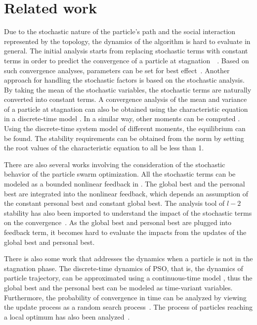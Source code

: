\section{Related work}
\label{sec:rel_work}

Due to the stochastic nature of the particle's path and the social interaction represented by the topology, the dynamics of the algorithm is hard to evaluate in general.
The initial analysis starts from replacing stochastic terms with constant terms in order to predict the convergence of a particle at stagnation~\cite{985692}~\cite{4424687}.
Based on such convergence analyses, parameters can be set for best effect~\cite{Trelea2003317}.
Another approach for handling the stochastic factors is based on the stochastic analysis.
By taking the mean of the stochastic variables, the stochastic terms are naturally converted into
constant terms.
A convergence analysis of the mean and variance of a particle at stagnation can also be obtained using the characteristic equation in a discrete-time model 
\cite{Jiang20078}.
In a similar way, 
other moments can be computed
\cite{5175367,Poli:2007:EAS:1276958.1276977,Poli:2008:DSS:1384929.1384944}.
Using the discrete-time system model of different moments, the equilibrium can be found.
The stability requirements can be obtained from the norm by setting the root values of the characteristic equation to all be less than 1.

There are also several works involving the consideration of the stochastic behavior of the particle swarm optimization.
All the stochastic terms can be modeled as a bounded nonlinear feedback in \cite{1637686}.
The global best and the personal best are integrated into the nonlinear feedback, which depends an assumption of the constant personal best and constant global best.
The analysis tool of $ l-2 $ stability has also been imported to understand the impact of the stochastic terms on the convergence~\cite{5160341}.
As the global best and personal best are plugged into feedback term, it becomes hard to evaluate the impacts from the updates of the global best and personal best.

There is also some work that addresses the dynamics when a particle is not in the stagnation phase.
The discrete-time dynamics of PSO, that is, the dynamics of particle trajectory, can be approximated
using a continuous-time model
\cite{5675669}, thus the global best and the personal best can be modeled as time-variant variables.
Furthermore, the probability of convergence in time can be analyzed by viewing the update process as a random search process~\cite{vandenBergh:2010:CPP:2010420.2010421}.
The process of particles reaching a local optimum has also been analyzed~\cite{Schmitt:2013:PSO:2463372.2463563}.

